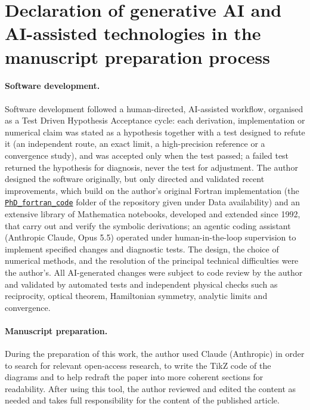 \documentclass[11pt,a4paper]{article}
\begin{document}
\section*{Declaration of generative AI and AI-assisted technologies in the manuscript preparation process}
\paragraph{Software development.} Software development followed a human-directed, AI-assisted
workflow, organised as a Test Driven Hypothesis Acceptance cycle: each derivation, implementation or
numerical claim was stated as a hypothesis together with a test designed to refute it (an independent
route, an exact limit, a high-precision reference or a convergence study), and was accepted only when
the test passed; a failed test returned the hypothesis for diagnosis, never the test for adjustment. The author designed the software originally, but only directed and validated recent
improvements, which build on the author's original Fortran implementation (the
\href{https://github.com/tmnestor/MultipleScatteringCalculations/tree/main/PhD_fortran_code}{\texttt{PhD\_fortran\_code}}
folder of the repository given under Data availability) and an extensive library of Mathematica notebooks, developed and extended since 1992, that carry out and verify the symbolic
derivations; an agentic
coding assistant (Anthropic Claude, Opus 5.5) operated under human-in-the-loop supervision to implement
specified changes and diagnostic tests. The design, the choice of numerical methods, and the resolution
of the principal technical difficulties were the author's. All AI-generated changes were subject to code
review by the author and validated by automated tests and independent physical checks such as
reciprocity, optical theorem, Hamiltonian symmetry, analytic limits and convergence.

\paragraph{Manuscript preparation.} During the preparation of this work, the author used Claude
(Anthropic) in order to search for relevant open-access research, to write the TikZ code of the
diagrams and to help redraft the paper into more coherent sections for readability. After using this tool, the author reviewed and edited the content
as needed and takes full responsibility for the content of the published article.



\end{document}
